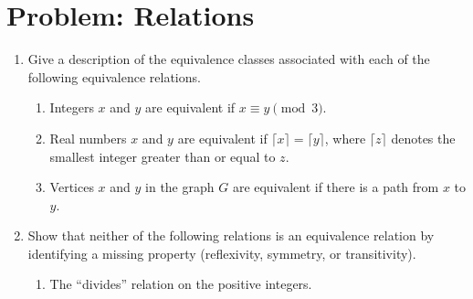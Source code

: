 \documentclass[12pt]{article}
\begin{document}
\section{Problem: Relations}
\begin{enumerate}
\item
Give a description of the equivalence classes associated with each of
the following equivalence relations.

\begin{enumerate}

\item Integers $x$ and $y$ are equivalent if $x \equiv y \pmod{3}$.


\item Real numbers $x$ and $y$ are equivalent if $\lceil x \rceil =
\lceil y \rceil$, where $\lceil z \rceil$ denotes the smallest integer
greater than or equal to $z$.


\item Vertices $x$ and $y$ in the graph $G$ are equivalent if there
is a path from $x$ to $y$.


\end{enumerate}


\item
Show that neither of the following relations is an equivalence
relation by identifying a missing property (reflexivity, symmetry, or
transitivity).

\begin{enumerate}

\item The ``divides'' relation on the positive integers.


\end{enumerate}
\end{enumerate}
\end{document}
